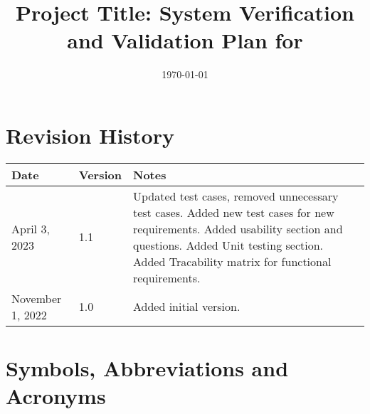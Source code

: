 \documentclass[12pt, titlepage]{article}
\begin{document}
\title{Project Title: System Verification and Validation Plan for \progname{}} 
\author{\authname}
\date{\today}
	
\maketitle


\section{Revision History}

\begin{tabularx}{\textwidth}{p{3cm}p{2cm}X}
\toprule {\bf Date} & {\bf Version} & {\bf Notes}\\
\midrule
April 3, 2023 & 1.1 & Updated test cases, removed unnecessary test cases. Added new test cases for new requirements. Added usability section and questions. Added Unit testing section. Added Tracability matrix for functional requirements. \\
\midrule
November 1, 2022 & 1.0 & Added initial version.\\
\bottomrule
\end{tabularx}

\newpage

\tableofcontents

\listoftables

\newpage

\section{Symbols, Abbreviations and Acronyms}

\renewcommand{\arraystretch}{1.2}
\end{document}
